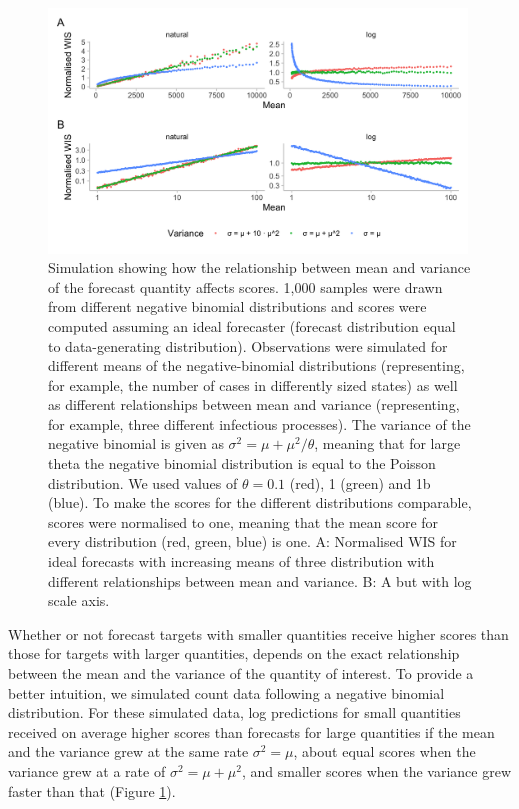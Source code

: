 \documentclass{article}
\begin{document}
\begin{figure}[h!]
    \centering
    \includegraphics[width=0.99\textwidth]{output/figures/SIM-mean-state-size.png}
    \caption{Simulation showing how the relationship between mean and variance of the forecast quantity affects scores. 1,000 samples were drawn from different negative binomial distributions and scores were computed assuming an ideal forecaster (forecast distribution equal to data-generating distribution). Observations were simulated for different means of the negative-binomial distributions (representing, for example, the number of cases in differently sized states) as well as different relationships between mean and variance (representing, for example, three different infectious processes). The variance of the negative binomial is given as $\sigma^2 = \mu + \mu^2 / \theta$, meaning that for large theta the negative binomial distribution is equal to the Poisson distribution. We used values of $\theta = 0.1$ (red), 1 (green) and 1b (blue). To make the scores for the different distributions comparable, scores were normalised to one, meaning that the mean score for every distribution (red, green, blue) is one. 
    A: Normalised WIS for ideal forecasts with increasing means of three distribution with different relationships between mean and variance. B: A but with log scale axis.}
    \label{fig:SIM-wis-state-size-mean}
\end{figure}

Whether or not forecast targets with smaller quantities receive higher scores than those for targets with larger quantities, depends on the exact relationship between the mean and the variance of the quantity of interest. To provide a better intuition, we simulated count data following a negative binomial distribution. For these simulated data, log predictions for small quantities received on average higher scores than forecasts for large quantities if the mean and the variance grew at the same rate $\sigma^2 = \mu$, about equal scores when the variance grew at a rate of $\sigma^2 = \mu + \mu^2$, and smaller scores when the variance grew faster than that (Figure \ref{fig:SIM-wis-state-size-mean}). 
\end{document}
